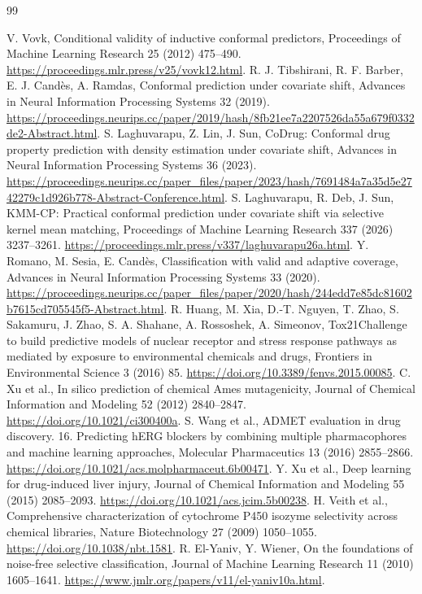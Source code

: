 \begin{thebibliography}{99}
\raggedright
{}
 V. Vovk, Conditional validity of inductive conformal predictors, Proceedings of Machine Learning Research 25 (2012) 475--490. \url{https://proceedings.mlr.press/v25/vovk12.html}.
 R. J. Tibshirani, R. F. Barber, E. J. Cand\`es, A. Ramdas, Conformal prediction under covariate shift, Advances in Neural Information Processing Systems 32 (2019). \url{https://proceedings.neurips.cc/paper/2019/hash/8fb21ee7a2207526da55a679f0332de2-Abstract.html}.
 S. Laghuvarapu, Z. Lin, J. Sun, CoDrug: Conformal drug property prediction with density estimation under covariate shift, Advances in Neural Information Processing Systems 36 (2023). \url{https://proceedings.neurips.cc/paper_files/paper/2023/hash/7691484a7a35d5e2742279c1d926b778-Abstract-Conference.html}.
 S. Laghuvarapu, R. Deb, J. Sun, KMM-CP: Practical conformal prediction under covariate shift via selective kernel mean matching, Proceedings of Machine Learning Research 337 (2026) 3237--3261. \url{https://proceedings.mlr.press/v337/laghuvarapu26a.html}.
 Y. Romano, M. Sesia, E. Cand\`es, Classification with valid and adaptive coverage, Advances in Neural Information Processing Systems 33 (2020). \url{https://proceedings.neurips.cc/paper_files/paper/2020/hash/244edd7e85dc81602b7615cd705545f5-Abstract.html}.
 R. Huang, M. Xia, D.-T. Nguyen, T. Zhao, S. Sakamuru, J. Zhao, S. A. Shahane, A. Rossoshek, A. Simeonov, Tox21Challenge to build predictive models of nuclear receptor and stress response pathways as mediated by exposure to environmental chemicals and drugs, Frontiers in Environmental Science 3 (2016) 85. \url{https://doi.org/10.3389/fenvs.2015.00085}.
 C. Xu et al., In silico prediction of chemical Ames mutagenicity, Journal of Chemical Information and Modeling 52 (2012) 2840--2847. \url{https://doi.org/10.1021/ci300400a}.
 S. Wang et al., ADMET evaluation in drug discovery. 16. Predicting hERG blockers by combining multiple pharmacophores and machine learning approaches, Molecular Pharmaceutics 13 (2016) 2855--2866. \url{https://doi.org/10.1021/acs.molpharmaceut.6b00471}.
 Y. Xu et al., Deep learning for drug-induced liver injury, Journal of Chemical Information and Modeling 55 (2015) 2085--2093. \url{https://doi.org/10.1021/acs.jcim.5b00238}.
 H. Veith et al., Comprehensive characterization of cytochrome P450 isozyme selectivity across chemical libraries, Nature Biotechnology 27 (2009) 1050--1055. \url{https://doi.org/10.1038/nbt.1581}.
 R. El-Yaniv, Y. Wiener, On the foundations of noise-free selective classification, Journal of Machine Learning Research 11 (2010) 1605--1641. \url{https://www.jmlr.org/papers/v11/el-yaniv10a.html}.
\end{thebibliography}
